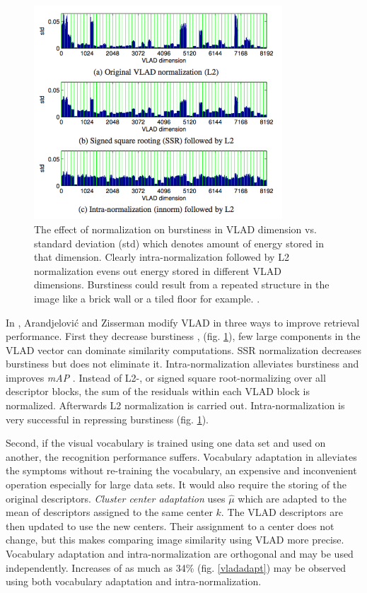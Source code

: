\documentclass[english,12pt,a4paper,pdftex,elec,utf8, table]{aaltothesis}
\begin{document}
\begin{figure}[htb]
\begin{center}
\includegraphics[height=8cm]{figures/vladnorm}
\end{center}
\caption{The effect of normalization on burstiness in VLAD dimension vs. standard deviation (std) which denotes amount of energy stored in that dimension. Clearly intra-normalization followed by L2 normalization evens out energy stored in different VLAD dimensions. Burstiness could result from a repeated structure in the image like a brick wall or a tiled floor for example. \cite{Arandjelovic2013}.}
\label{vladburstiness}
\end{figure}

In \cite{Arandjelovic2013}, Arandjelovi\'{c} and Zisserman modify VLAD in three ways to improve retrieval performance. First they decrease burstiness \cite{Jegou2009}, \cite{Delhumeau2013} (fig. \ref{vladburstiness}), few large components in the VLAD vector can dominate similarity computations. SSR normalization decreases burstiness but does not eliminate it. Intra-normalization alleviates burstiness and improves \emph{mAP} \cite{Arandjelovic2013}. Instead of L2-, or signed square root-normalizing over all descriptor blocks, the sum of the residuals within each VLAD block is normalized. Afterwards L2 normalization is carried out. Intra-normalization is very successful in repressing burstiness (fig. \ref{vladburstiness}).

Second, if the visual vocabulary is trained using one data set and used on another, the recognition performance suffers. Vocabulary adaptation in \cite{Arandjelovic2013} alleviates the symptoms without re-training the vocabulary, an expensive and inconvenient operation especially for large data sets. It would also require the storing of the original descriptors. \emph{Cluster center adaptation} uses $\hat{\mu}$ which are adapted to the mean of descriptors assigned to the same center $k$. The VLAD descriptors are then updated to use the new centers. Their assignment to a center does not change, but this makes comparing image similarity using VLAD more precise. Vocabulary adaptation and intra-normalization are orthogonal and may be used independently. Increases of as much as 34\% (fig. \ref{vladadapt}) may be observed using both vocabulary adaptation and intra-normalization. \cite{Arandjelovic2013}
\end{document}
